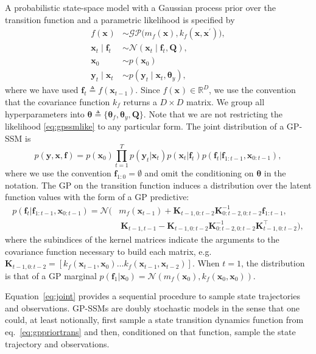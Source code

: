 \documentclass{article} %
\newcommand{\n}[1]{\mathbf{#1}}
\newcommand{\x}{\mathbf{x}}
\newcommand{\y}{\mathbf{y}}
\newcommand{\btheta}{\boldsymbol\theta}
\begin{document}
A probabilistic state-space model with a Gaussian process prior over the transition function and a parametric likelihood is specified by
\begin{subequations}
\begin{align}
f(\x_{}) &\sim \mathcal{GP}\big(m_{f}(\x), k_{f}(\x, \x^\prime)\big), \label{eq:gppriortrans}\\ 
\x_{t} \mid \n{f}_{t} &\sim \mathcal{N}(\x_{t} \mid \n{f}_{t}, \n{Q}),  \\
\x_0 &\sim p(\x_0) \\
\y_t \mid \x_t &\sim p(\y_t \mid \x_t , \btheta_y), \label{eq:gpssmlike}
\end{align}
\end{subequations}
where we have used $\n{f}_{t} \triangleq f(\x_{t-1})$. Since $f(\x_{}) \in \mathbb{R}^D$, we use the convention that the covariance function $k_{f}$ returns a $D \times D$ matrix. We group all hyperparameters into $\btheta \triangleq \{\btheta_f,\btheta_y,\n{Q}\}$. Note that we are not restricting the likelihood \eqref{eq:gpssmlike} to any particular form. The joint distribution of a GP-SSM is
\begin{equation}
\label{eq:joint}
	p(\y,\x,\n{f}) = p(\x_0) \prod_{t=1}^T p(\y_t | \x_t)  p(\x_t | \n{f}_t) p(\n{f}_t | \n{f}_{1:t-1},\x_{0:t-1}),
\end{equation}
where we use the convention $\n{f}_{1:0} = \emptyset$ and omit the conditioning on $\btheta$ in the notation. The GP on the transition function induces a distribution over the latent function values with the form of a GP predictive:
\vspace{-2mm}
\begin{align}
	p(\n{f}_t | \n{f}_{1:t-1},\x_{0:t-1}) = \mathcal{N}\big(& m_f(\x_{t-1}) + \n{K}_{t-1,0:t-2}  \n{K}_{0:t-2,0:t-2}^{-1}   \n{f}_{1:t-1} ,   \nonumber \\
	 &  \ \n{K}_{t-1,t-1} -  \n{K}_{t-1,0:t-2}  \n{K}_{0:t-2,0:t-2}^{-1}  \n{K}_{t-1,0:t-2}^\top \big),
\end{align}
where the subindices of the kernel matrices indicate the arguments to the covariance function necessary to build each matrix, e.g. $\n{K}_{t-1,0:t-2}=[k_{f}(\x_{t-1}, \x_{0}) \ldots k_{f}(\x_{t-1}, \x_{t-2})]$. When $t=1$, the distribution is that of a GP marginal  $p(\n{f}_1|\x_0) = \mathcal{N}(m_f(\x_0),k_f(\x_0,\x_0))$.

Equation~\eqref{eq:joint} provides a sequential procedure to sample state trajectories and observations. GP-SSMs are doubly stochastic models in the sense that one could, at least notionally, first sample a state transition dynamics function from eq.~\eqref{eq:gppriortrans} and then, conditioned on that function, sample the state trajectory and observations. 
\end{document}
